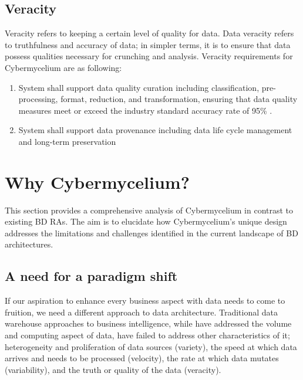 \documentclass[review]{elsarticle}
\begin{document}
\subsection{Veracity}

Veracity refers to keeping a certain level of quality for data. Data veracity refers to truthfulness and accuracy of data; in simpler terms, it is to ensure that data possess qualities necessary for crunching and analysis. Veracity requirements for Cybermycelium are as following: 

\begin{enumerate}[label=\textbf{Ver-\arabic*}]
    \item System shall support data quality curation including classification, pre-processing, format, reduction, and transformation, ensuring that data quality measures meet or exceed the industry standard accuracy rate of 95\% \cite{reis2022fundamentals}.
    \item System shall support data provenance including data life cycle management and long-term preservation
\end{enumerate}




\section{Why Cybermycelium?} \label{theory-section}

This section provides a comprehensive analysis of Cybermycelium in contrast to existing BD RAs. The aim is to elucidate how Cybermycelium's unique design addresses the limitations and challenges identified in the current landscape of BD architectures.





\subsection{A need for a paradigm shift} \label{need for paradigm shift}

If our aspiration to enhance every business aspect with data needs to come to fruition, we need a different approach to data architecture. Traditional data warehouse approaches to business intelligence, while have addressed the volume and computing aspect of data, have failed to address other characteristics of it; heterogeneity and proliferation of data sources (variety), the speed at which data arrives and needs to be processed (velocity), the rate at which data mutates (variability), and the truth or quality of the data (veracity).
\end{document}
